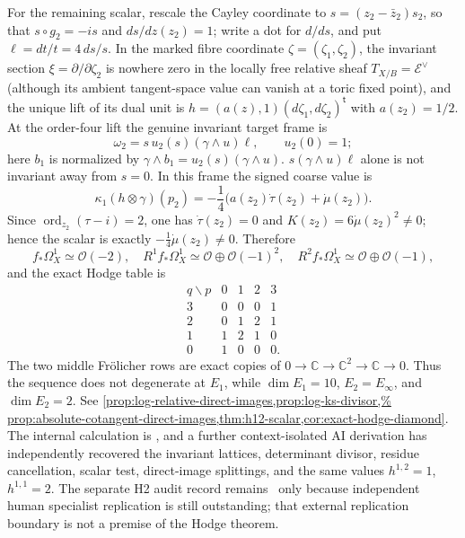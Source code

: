 \begin{enumerate}[leftmargin=1.8em,itemsep=.65em]
For the remaining scalar, rescale the Cayley coordinate to
$s=(z_2-\bar z_2)s_2$, so that
$s\circ g_2=-is$ and $ds/dz(z_2)=1$; write a dot for $d/ds$, and put
$\ell=dt/t=4\,ds/s$.  In the marked fibre coordinate
$\zeta=(\zeta_1,\zeta_2)$, the invariant section
$\xi=\partial/\partial\zeta_2$ is nowhere zero in the locally free relative
sheaf $T_{X/B}=\mathcal E^\vee$ (although its ambient tangent-space value can
vanish at a toric fixed point), and the unique lift of its dual unit is
$h=(a(z),1)(d\zeta_1,d\zeta_2)^{\mathsf t}$ with $a(z_2)=1/2$.
At the order-four lift the genuine invariant target frame is
\[
 \omega_2=s\,u_2(s)(\gamma\wedge u)\ell,\qquad u_2(0)=1;
\]
here $b_1$ is normalized by
$\gamma\wedge b_1=u_2(s)(\gamma\wedge u)$.
$s(\gamma\wedge u)\ell$ alone is not invariant away from $s=0$.
In this frame the signed coarse value is
\[
 \kappa_1(h\otimes\gamma)(p_2)
 =-\frac14\bigl(a(z_2)\dot\tau(z_2)+\dot\mu(z_2)\bigr).
\]
Since $\operatorname{ord}_{z_2}(\tau-i)=2$, one has
$\dot\tau(z_2)=0$ and
$K(z_2)=6\dot\mu(z_2)^2\ne0$; hence the scalar is exactly
$-\frac14\dot\mu(z_2)\ne0$.  Therefore
\[
f_*\Omega_X^1\simeq\mathcal O(-2),\quad
R^1f_*\Omega_X^1\simeq\mathcal O\oplus\mathcal O(-1)^2,\quad
R^2f_*\Omega_X^1\simeq\mathcal O\oplus\mathcal O(-1),
\]
and the exact Hodge table is
\[
\begin{array}{c|cccc}
q\backslash p&0&1&2&3\\ \hline
3&0&0&0&1\\
2&0&1&2&1\\
1&1&2&1&0\\
0&1&0&0&0.
\end{array}
\]
The two middle Fr\"olicher rows are exact copies of
$0\to\mathbb C\to\mathbb C^2\to\mathbb C\to0$.  Thus the sequence does
not degenerate at $E_1$, while
$\dim E_1=10$, $E_2=E_\infty$, and $\dim E_2=2$.  See
 \cref{prop:log-relative-direct-images,prop:log-ks-divisor,%
 prop:absolute-cotangent-direct-images,thm:h12-scalar,cor:exact-hodge-diamond}.
The internal calculation is \Verified, and a further context-isolated AI
derivation has independently recovered the invariant lattices, determinant
divisor, residue cancellation, scalar test, direct-image splittings, and the
same values $h^{1,2}=1$, $h^{1,1}=2$.  The separate H2 audit record remains
\Open\ only because independent human specialist replication is still
outstanding; that external replication boundary is not a premise of the
Hodge theorem.


\end{enumerate}
